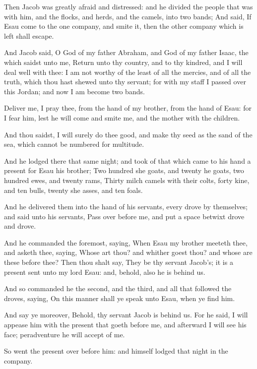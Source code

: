 \Verse Then Jacob was greatly afraid and distressed: and he divided the people that was with him, and the flocks, and herds, and the camels, into two bands; \Verse And said, If Esau come to the one company, and smite it, then the other company which is left shall escape.

\Verse And Jacob said, O God of my father Abraham, and God of my father Isaac, the \LORD which saidst unto me, Return unto thy country, and to thy kindred, and I will deal well with thee: \Verse I am not worthy of the least of all the mercies, and of all the truth, which thou hast shewed unto thy servant; for with my staff I passed over this Jordan; and now I am become two bands.

\Verse Deliver me, I pray thee, from the hand of my brother, from the hand of Esau: for I fear him, lest he will come and smite me, and the mother with the children.

\Verse And thou saidst, I will surely do thee good, and make thy seed as the sand of the sea, which cannot be numbered for multitude.

\Verse And he lodged there that same night; and took of that which came to his hand a present for Esau his brother; \Verse Two hundred she goats, and twenty he goats, two hundred ewes, and twenty rams, \Verse Thirty milch camels with their colts, forty kine, and ten bulls, twenty she asses, and ten foals.

\Verse And he delivered them into the hand of his servants, every drove by themselves; and said unto his servants, Pass over before me, and put a space betwixt drove and drove.

\Verse And he commanded the foremost, saying, When Esau my brother meeteth thee, and asketh thee, saying, Whose art thou? and whither goest thou? and whose are these before thee?  \Verse Then thou shalt say, They be thy servant Jacob's; it is a present sent unto my lord Esau: and, behold, also he is behind us.

\Verse And so commanded he the second, and the third, and all that followed the droves, saying, On this manner shall ye speak unto Esau, when ye find him.

\Verse And say ye moreover, Behold, thy servant Jacob is behind us. For he said, I will appease him with the present that goeth before me, and afterward I will see his face; peradventure he will accept of me.

\Verse So went the present over before him: and himself lodged that night in the company.


